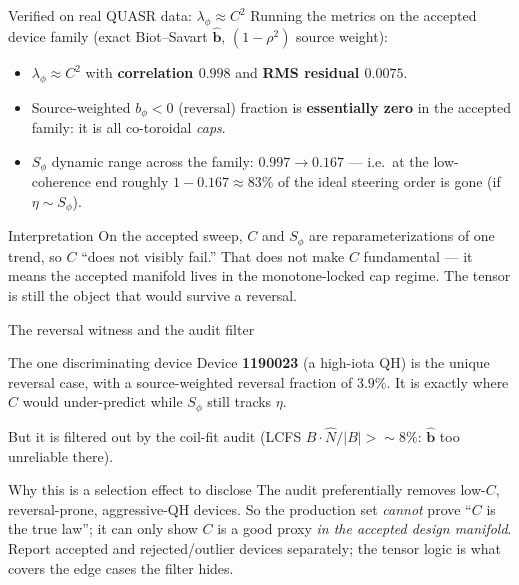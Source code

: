 \documentclass[aspectratio=169]{beamer}
\newcommand{\bb}{\hat{\bm b}}
\newcommand{\Sphi}{S_\phi}
\newcommand{\lamphi}{\lambda_\phi}
\begin{document}
\begin{frame}[t]{Verified on real QUASR data: $\lamphi\approx C^2$}
Running the metrics on the accepted device family (exact Biot--Savart $\bb$, $(1-\rho^2)$ source weight):
\begin{itemize}
  \item $\lamphi \approx C^2$ with \textbf{correlation $0.998$} and \textbf{RMS residual $0.0075$}.
  \item Source-weighted $b_\phi<0$ (reversal) fraction is \textbf{essentially zero} in the accepted family: it is all co-toroidal \emph{caps}.
  \item $\Sphi$ dynamic range across the family: $\mathbf{0.997 \to 0.167}$ --- i.e.\ at the low-coherence end roughly $1-0.167\approx 83\%$ of the ideal steering order is gone (if $\eta\sim\Sphi$).
\end{itemize}
\begin{block}{Interpretation}
On the accepted sweep, $C$ and $\Sphi$ are reparameterizations of one trend, so $C$ ``does not visibly fail.'' That does not make $C$ fundamental --- it means the accepted manifold lives in the monotone-locked cap regime. The tensor is still the object that would survive a reversal.
\end{block}
\end{frame}

\begin{frame}[t]{The reversal witness and the audit filter}
\begin{block}{The one discriminating device}
Device \textbf{1190023} (a high-iota QH) is the unique reversal case, with a source-weighted reversal fraction of $\mathbf{3.9\%}$. It is exactly where $C$ would under-predict while $\Sphi$ still tracks $\eta$.
\end{block}
\alert{But} it is filtered out by the coil-fit audit (LCFS $B\!\cdot\!\hat N/|B| > \sim 8\%$: $\bb$ too unreliable there).
\begin{block}{Why this is a selection effect to disclose}
The audit preferentially removes low-$C$, reversal-prone, aggressive-QH devices. So the production set \emph{cannot} prove ``$C$ is the true law''; it can only show $C$ is a good proxy \emph{in the accepted design manifold}. Report accepted and rejected/outlier devices separately; the tensor logic is what covers the edge cases the filter hides.
\end{block}
\end{frame}
\end{document}
